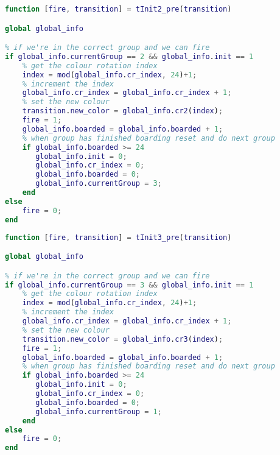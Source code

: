 \begin{lstlisting}[language=MATLAB, caption=tInit2\_pre.m]
function [fire, transition] = tInit2_pre(transition)

global global_info

% if we're in the correct group and we can fire
if global_info.currentGroup == 2 && global_info.init == 1
    % get the colour rotation index
    index = mod(global_info.cr_index, 24)+1;
    % increment the index
    global_info.cr_index = global_info.cr_index + 1;
    % set the new colour
    transition.new_color = global_info.cr2(index);
    fire = 1;
    global_info.boarded = global_info.boarded + 1;
    % when group has finished boarding reset and do next group
    if global_info.boarded >= 24
       global_info.init = 0;
       global_info.cr_index = 0;
       global_info.boarded = 0;
       global_info.currentGroup = 3;  
    end
else
    fire = 0;
end
\end{lstlisting}

\begin{lstlisting}[language=MATLAB, caption=tInit3\_pre.m]
function [fire, transition] = tInit3_pre(transition)

global global_info

% if we're in the correct group and we can fire
if global_info.currentGroup == 3 && global_info.init == 1
    % get the colour rotation index
    index = mod(global_info.cr_index, 24)+1;
    % increment the index
    global_info.cr_index = global_info.cr_index + 1;
    % set the new colour
    transition.new_color = global_info.cr3(index);
    fire = 1;
    global_info.boarded = global_info.boarded + 1;
    % when group has finished boarding reset and do next group
    if global_info.boarded >= 24
       global_info.init = 0;
       global_info.cr_index = 0;
       global_info.boarded = 0;
       global_info.currentGroup = 1;  
    end
else
    fire = 0;
end
\end{lstlisting}

